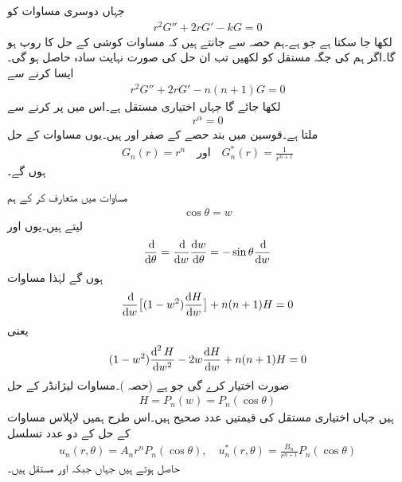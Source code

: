 جہاں دوسری مساوات کو 
\begin{align*}
r^2G''+2rG'-kG=0
\end{align*}
لکھا جا سکتا ہے جو  ہے۔ہم  حصہ  سے جانتے ہیں کہ مساوات کوشی کے حل کا روپ  ہو گا۔اگر ہم  کی جگہ مستقل کو  لکھیں تب ان حل کی صورت نہایت سادہ حاصل ہو گی۔ایسا کرنے سے 
\begin{align}\label{مساوات_جزوی_کرہ_بار_بردار_ج}
r^2G''+2rG'-n(n+1)G=0
\end{align}
لکھا جائے گا جہاں  اختیاری مستقل ہے۔اس میں  پر کرنے سے
\begin{align*}
[\alpha(\alpha-1)+2\alpha-n(n+1)]r^{\alpha}=0
\end{align*}
ملتا ہے۔قوسین میں بند حصے کے صفر  اور  ہیں۔یوں مساوات  کے حل
\begin{align}\label{مساوات_جزوی_کرہ_بار_بردار_چ}
G_n(r)=r^n\quad \text{اور}\quad G^*_n(r)=\frac{1}{r^{n+1}}
\end{align}
ہوں گے۔
 
مساوات  میں  متعارف کر کے ہم 
\begin{align*}
\cos \theta=w
\end{align*}
لیتے ہیں۔یوں  اور
\begin{align*}
\frac{\dif}{\dif \theta}=\frac{\dif}{\dif w}\frac{\dif w}{\dif \theta}=-\sin\theta \frac{\dif}{\dif w}
\end{align*}
ہوں گے لہٰذا مساوات  
\begin{align}\label{مساوات_جزوی_کرہ_بار_بردار_ح}
\frac{\dif}{\dif w}\big[(1-w^2)\frac{\dif H}{\dif w}\big]+n(n+1)H=0
\end{align}
یعنی
\begin{align}\label{مساوات_جزوی_کرہ_بار_بردار_خ}
(1-w^2)\frac{\dif^{\,2} H}{\dif w^2}-2w\frac{\dif H}{\dif w}+n(n+1)H=0
\end{align}
صورت اختیار کرے گی جو  ہے (حصہ )۔مساوات لیژانڈر کے حل
\begin{align*}
H=P_n(w)=P_n(\cos \theta)
\end{align*}
ہیں جہاں اختیاری مستقل کی قیمتیں  عدد صحیح ہیں۔اس طرح ہمیں لاپلاس مساوات  کے حل  کے دو عدد تسلسل
\begin{align}\label{مساوات_جزوی_لیژانڈر_دو_عدد_حل}
u_n(r,\theta)=A_nr^nP_n(\cos\theta),\quad u^*_n(r,\theta)=\frac{B_n}{r^{n+1}}P_n(\cos\theta)
\end{align}
حاصل ہوتے ہیں جہاں  جبکہ  اور  مستقل ہیں۔


